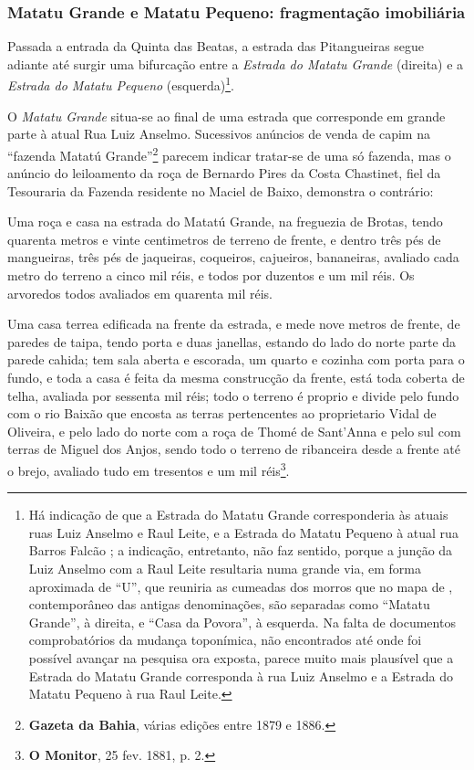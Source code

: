 \begin{citacao}
\begin{citacao}

\end{citacao}

\subsubsection{Matatu Grande e Matatu Pequeno: fragmentação imobiliária}

Passada a entrada da Quinta das Beatas, a estrada das Pitangueiras segue adiante até surgir uma bifurcação entre a \textit{Estrada do Matatu Grande} (direita) e a \textit{Estrada do Matatu Pequeno} (esquerda)\footnote{Há indicação de que a Estrada do Matatu Grande corresponderia às atuais ruas Luiz Anselmo e Raul Leite, e a Estrada do Matatu Pequeno à atual rua Barros Falcão \cite[p.~124]{valladares_beaba_2012}; a indicação, entretanto, não faz sentido, porque a junção da Luiz Anselmo com a Raul Leite resultaria numa grande via, em forma aproximada de ``U'', que reuniria as cumeadas dos morros que no mapa de , contemporâneo das antigas denominações, são separadas como ``Matatu Grande'', à direita, e ``Casa da Povora'', à esquerda. Na falta de documentos comprobatórios da mudança toponímica, não encontrados até onde foi possível avançar na pesquisa ora exposta, parece muito mais plausível que a Estrada do Matatu Grande corresponda à rua Luiz Anselmo e a Estrada do Matatu Pequeno à rua Raul Leite.}.

O \textit{Matatu Grande} situa-se ao final de uma estrada que corresponde em grande parte à atual Rua Luiz Anselmo. Sucessivos anúncios de venda de capim na ``fazenda Matatú Grande''\footnote{\textbf{Gazeta da Bahia}, várias edições entre 1879 e 1886.} parecem indicar tratar-se de uma só fazenda, mas o anúncio do leiloamento da roça de Bernardo Pires da Costa Chastinet, fiel da Tesouraria da Fazenda residente no Maciel de Baixo, demonstra o contrário:

\begin{citacao}
Uma roça e casa na estrada do Matatú Grande, na freguezia de Brotas, tendo quarenta metros e vinte centimetros de terreno de frente, e dentro três pés de mangueiras, três pés de jaqueiras, coqueiros, cajueiros, bananeiras, avaliado cada metro do terreno a cinco mil réis, e todos por duzentos e um mil réis. Os arvoredos todos avaliados em quarenta mil réis.

Uma casa terrea edificada na frente da estrada, e mede nove metros de frente, de paredes de taipa, tendo porta e duas janellas, estando do lado do norte parte da parede cahida; tem sala aberta e escorada, um quarto e cozinha com porta para o fundo, e toda a casa é feita da mesma construcção da frente, está toda coberta de telha, avaliada por sessenta mil réis; todo o terreno é proprio e divide pelo fundo com o rio Baixão que encosta as terras pertencentes ao proprietario Vidal de Oliveira, e pelo lado do norte com a roça de Thomé de Sant'Anna e pelo sul com terras de Miguel dos Anjos, sendo todo o terreno de ribanceira desde a frente até o brejo, avaliado tudo em tresentos e um mil réis\footnote{\textbf{O Monitor}, 25 fev. 1881, p. 2.}.
\end{citacao}


\end{citacao}
